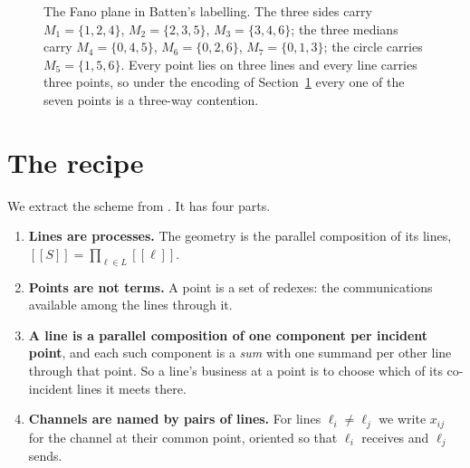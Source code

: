 \documentclass[11pt]{article}
\theoremstyle{plain}
\theoremstyle{definition}
\theoremstyle{remark}
\newcommand{\enc}[1]{[\![#1]\!]}
\begin{document}
\begin{figure}[t]
\centering
{}
\caption{The Fano plane in Batten's labelling. The three sides carry
$M_1 = \{1,2,4\}$, $M_2 = \{2,3,5\}$, $M_3 = \{3,4,6\}$; the three medians carry
$M_4 = \{0,4,5\}$, $M_6 = \{0,2,6\}$, $M_7 = \{0,1,3\}$; the circle carries
$M_5 = \{1,5,6\}$. Every point lies on three lines and every line carries three points,
so under the encoding of Section~\ref{sec:recipe} every one of the seven points is a
three-way contention.}
\label{fig:fano}
\end{figure}

\section{The recipe}
\label{sec:recipe}

We extract the scheme from \cite{Fano05}. It has four parts.

\begin{enumerate}
\item \textbf{Lines are processes.} The geometry is the parallel composition of its lines,
$\enc{S} = \prod_{\ell \in L} \enc{\ell}$.
\item \textbf{Points are not terms.} A point is a set of redexes: the communications
available among the lines through it.
\item \textbf{A line is a parallel composition of one component per incident point}, and
each such component is a \emph{sum} with one summand per other line through that point.
So a line's business at a point is to choose which of its co-incident lines it meets there.
\item \textbf{Channels are named by pairs of lines.} For lines $\ell_i \neq \ell_j$ we
write $x_{ij}$ for the channel at their common point, oriented so that $\ell_i$ receives
and $\ell_j$ sends.
\end{enumerate}
\end{document}
